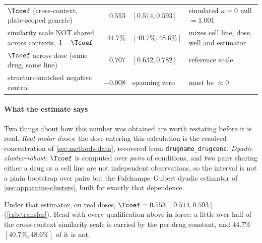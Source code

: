 \begin{table}[htbp]
\begin{lrbox}{\tvfb}
\begin{tabularx}{\textwidth}{@{}Z{1.12} r l Z{0.88}@{}}
 &  &  &  \\
\midrule
$\Tcoef$ (cross-context, plate-scoped generic) & $0.553$ & $[0.514, 0.593]$
  & simulated $\kappa{=}0$ null $= 1.001$ \\
similarity scale NOT shared across contexts, $1-\Tcoef$ & $44.7\%$
  & $[40.7\%, 48.6\%]$ & mixes cell line, dose, well and estimator \\
\addlinespace[10pt]
$\Tcoef$ across dose (same drug, same line) & $0.707$ & $[0.632, 0.782]$
  & reference scale \\
\addlinespace[10pt]
structure-matched negative control & $-0.008$ & spanning zero
  & must be $\approx 0$ \\
\end{tabularx}
\end{lrbox}
\end{table}
\paragraph{What the estimate says} Two things about how this number was obtained
are worth restating before it is read. \emph{Real molar doses}: the dose entering
this calculation is the resolved concentration of \cref{sec:methods-data},
recovered from \texttt{drugname\_drugconc}.
\emph{Dyadic cluster-robust}: $\hat{\Tcoef}$ is computed over \emph{pairs} of
conditions, and two pairs sharing either a drug or a cell line are not
independent observations, so the interval is not a plain bootstrap over pairs
but the Fafchamps--Gubert dyadic estimator of \cref{sec:apparatus-clusters},
built for exactly that dependence.

Under that estimator, on real doses, $\hat{\Tcoef} = 0.553$ $[0.514, 0.593]$
(\cref{tab:transfer}). Read with every qualification above in force: a little over
half of the cross-context similarity scale is carried by the per-drug constant,
and $44.7\%$ $[40.7\%, 48.6\%]$ of it is not.

